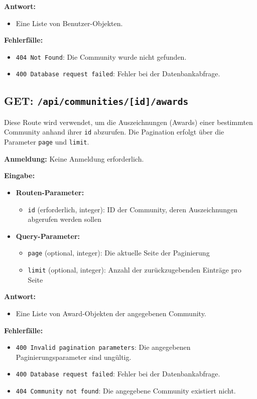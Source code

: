\documentclass[a4paper,12pt]{article}
\begin{document}
\textbf{Antwort:}
\begin{itemize}
    \item Eine Liste von Benutzer-Objekten.
\end{itemize}

\textbf{Fehlerfälle:}
\begin{itemize}
    \item \texttt{404 Not Found}:
        Die Community wurde nicht gefunden.
    \item \texttt{400 Database request failed}:
        Fehler bei der Datenbankabfrage.
\end{itemize}

\newpage
\subsection{GET: \texttt{/api/communities/[id]/awards}}

Diese Route wird verwendet, um die Auszeichnungen (Awards) einer bestimmten
Community anhand ihrer \texttt{id} abzurufen. Die Pagination erfolgt über die
Parameter \texttt{page} und \texttt{limit}.

\textbf{Anmeldung:} Keine Anmeldung erforderlich.

\textbf{Eingabe:}
\begin{itemize}
    \item \textbf{Routen-Parameter:}
    \begin{itemize}
        \item \texttt{id} (erforderlich, integer):
            ID der Community, deren Auszeichnungen abgerufen werden sollen
    \end{itemize}
    \item \textbf{Query-Parameter:}
    \begin{itemize}
        \item \texttt{page} (optional, integer):
            Die aktuelle Seite der Paginierung
        \item \texttt{limit} (optional, integer):
            Anzahl der zurückzugebenden Einträge pro Seite
    \end{itemize}
\end{itemize}

\textbf{Antwort:}
\begin{itemize}
    \item Eine Liste von Award-Objekten der angegebenen Community.
\end{itemize}

\textbf{Fehlerfälle:}
\begin{itemize}
    \item \texttt{400 Invalid pagination parameters}:
        Die angegebenen Paginierungsparameter sind ungültig.
    \item \texttt{400 Database request failed}:
        Fehler bei der Datenbankabfrage.
    \item \texttt{404 Community not found}:
        Die angegebene Community existiert nicht.
\end{itemize}
\end{document}
